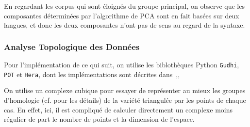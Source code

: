 \documentclass{cours}
\begin{document}
En regardant les corpus qui sont éloignés du groupe principal, on observe que les composantes déterminées par l'algorithme de PCA sont en fait basées sur deux langues, et donc les deux composantes n'ont pas de sens au regard de la syntaxe.

\subsubsection{Analyse Topologique des Données}\label{subsub:tda}
Pour l'implémentation de ce qui suit, on utilise les biblothèques Python \texttt{Gudhi}, \texttt{POT} et \texttt{Hera}, dont les implémentations sont décrites dans~\cite{Gudhi},\cite{PythonPOT},~\cite{Hera}

On utilise un complexe cubique pour essayer de représenter au mieux les groupes d'homologie (cf. \cite{tldrtda} pour les détails) de la variété triangulée par les points de chaque cas. En effet, ici, il est compliqué de calculer directement un complexe moins régulier de part le nombre de points et la dimension de l'espace.
\end{document}
